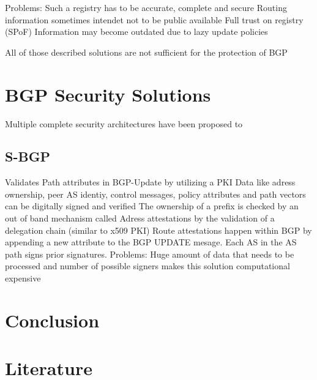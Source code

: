\documentclass[12pt]{IEEEtran}
\begin{document}
		Problems: 
			Such a registry has to be accurate, complete and secure
			Routing information sometimes intendet not to be public available
			Full trust on registry (SPoF)
			Information may become outdated due to lazy update policies
       		
       
       
       		
       			
	All of those described solutions are not sufficient for the protection of BGP

       \section{BGP Security Solutions}

       Multiple complete security architectures have been proposed to 
       \subsection{S-BGP}
			Validates Path attributes in BGP-Update by utilizing a PKI
			Data like adress ownership, peer AS identiy, control messages, policy attributes and path vectors can be digitally signed and verified
			The ownership of a prefix is checked by an out of band mechanism called Adress attestations by the validation of a delegation chain (similar to x509 PKI)
			Route attestations happen within BGP by appending a new attribute to the BGP UPDATE mesage. Each AS in the AS path signs prior signatures.
			Problems: 
				Huge amount of data that needs to be processed and number of possible signers makes this solution computational expensive
				
	\section{Conclusion}				

	
	\section{Literature}
\end{document}
